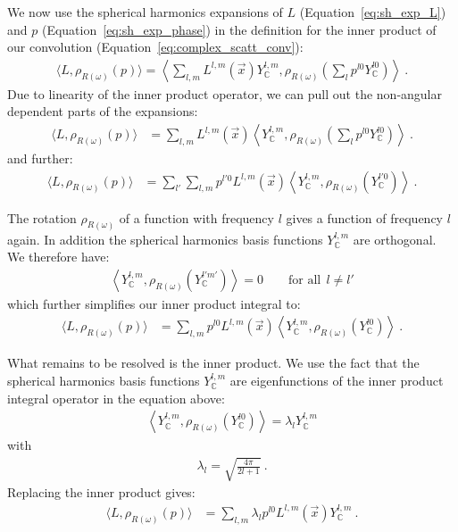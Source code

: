 \documentclass{egpubl}
\newcommand{\SHBC}{Y_{\mathbb{C}}} %
\begin{document}
We now use the spherical harmonics expansions of $L$ (Equation~\ref{eq:sh_exp_L}) and $p$ (Equation~\ref{eq:sh_exp_phase}) in the definition for the inner product of our convolution (Equation~\ref{eq:complex_scatt_conv}):
\begin{align*}
\langle L,  \rho_{R(\omega)}(p)\rangle = \left < \sum_{l,m}{L^{l,m}(\vec{x}) \SHBC^{l,m}}, \rho_{R(\omega)}\left ( \sum_{l}{p^{l0}\SHBC^{l0}} \right )\right> \ .
\end{align*}
Due to linearity of the inner product operator, we can pull out the non-angular dependent parts of the expansions:
\begin{align*}
\langle L,  \rho_{R(\omega)}(p)\rangle
&=
\sum_{l,m}
{
L^{l,m}(\vec{x})
\left<
\SHBC^{l,m},
\rho_{R(\omega)}
\left(\sum_l{p^{l0} \SHBC^{l0}}\right)
\right>
} \ .
\end{align*}
and further:
\begin{align*}
\langle L,  \rho_{R(\omega)}(p)\rangle
&=
\sum_{l'}
{
\sum_{l,m}
{
p^{l'0}L^{l,m}(\vec{x})
\left<\SHBC^{l,m}, \rho_{R(\omega)}\left( \SHBC^{l'0} \right)\right>
}
} \ .
\end{align*}

The rotation $\rho_{R(\omega)}$ of a function with frequency $l$ gives a function of frequency $l$ again. In addition the spherical harmonics basis functions $\SHBC^{l,m}$ are orthogonal. We therefore have:
\begin{align*}
\left<
\SHBC^{l,m}, \rho_{R(\omega)}\left(\SHBC^{l'm'}\right)
\right> = 0       \qquad    \text{for all}\ \ l\ne l'
\end{align*}
which further simplifies our inner product integral to:
\begin{align*}
\langle L,  \rho_{R(\omega)}(p)\rangle
&=
\sum_{l,m}
{
p^{l0}L^{l,m}(\vec{x})
\left<
\SHBC^{l,m}, \rho_{R(\omega)}\left(\SHBC^{l0} \right )
\right>
} \ .
\end{align*}

What remains to be resolved is the inner product. We use the fact that the spherical harmonics basis functions $ \SHBC^{l,m}$ are eigenfunctions of the inner product integral operator in the equation above:
\begin{align*}
\left<
\SHBC^{l,m}, \rho_{R(\omega)}\left ( \SHBC^{l0} \right )\right> = \lambda_l \SHBC^{l,m}
\end{align*}
with
\begin{align*}
\lambda_l=\sqrt{\frac{4\pi}{2l+1}} \ .
\end{align*}
Replacing the inner product gives:
\begin{align*}
\langle L,  \rho_{R(\omega)}(p)\rangle
&=
\sum_{l,m}
{
\lambda_l
p^{l0}L^{l,m}(\vec{x})
\SHBC^{l,m}
} \ .
\end{align*}
\end{document}
